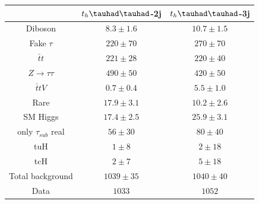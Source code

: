 \begin{table}[htbp]
\begin{tabular}{ccc} \toprule\toprule
& $t_{h}\thadhad$-2j & $t_{h}\thadhad$-3j\\\midrule
  Diboson                  & $8.3 \pm 1.6  $ & $ 10.7 \pm 1.5 $\\
  Fake $\tau$              & $220 \pm 70   $ & $ 270 \pm 70   $\\
  $\bar{t}t$               & $221 \pm 28   $ & $ 220 \pm 40   $\\
  $Z\rightarrow\tau\tau$   & $490 \pm 50   $ & $ 420 \pm 50   $\\
  $\bar{t}tV$              & $0.7 \pm 0.4  $ & $ 5.5 \pm 1.0  $\\
  Rare                     & $17.9 \pm 3.1 $ & $ 10.2 \pm 2.6 $\\
  SM Higgs                 & $17.4 \pm 2.5 $ & $ 25.9 \pm 3.1 $\\
  only $\tau_{sub}$ real   & $56 \pm 30    $ & $ 80 \pm 40    $ \\ \midrule
  tuH                      & $1 \pm 8      $ & $ 2 \pm 18     $\\
  tcH                      & $2 \pm 7      $ & $ 5 \pm 18     $\\ \midrule
  Total background         & $1039 \pm 35  $ & $ 1040 \pm 40  $\\ \midrule
  Data                     & $1033         $ & $ 1052         $\\
\bottomrule\bottomrule
\end{tabular}
\label{tab:HtautauPostfitYieldsUnblind}
\end{table}


